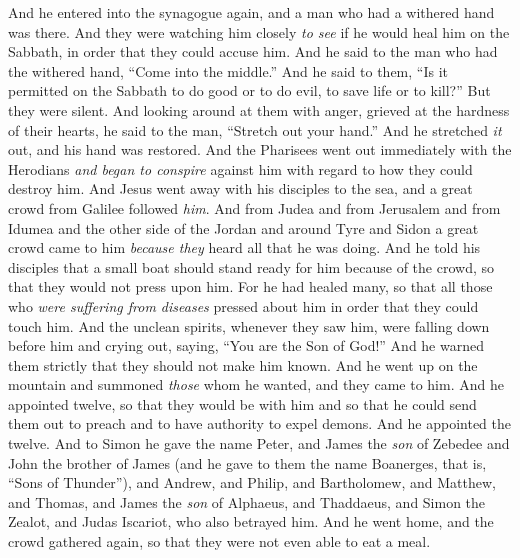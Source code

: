 \begin{biblechapter} %
 And he entered into the synagogue again, and a man who had a withered hand was there.
\verse And they were watching him closely \textit{to see} if he would heal him on the Sabbath, in order that they could accuse him.
\verse And he said to the man who had the withered hand, “Come into the middle.”
\verse And he said to them, “Is it permitted on the Sabbath to do good or to do evil, to save life or to kill?” But they were silent.
\verse And looking around at them with anger, grieved at the hardness of their hearts, he said to the man, “Stretch out your hand.” And he stretched \textit{it} out, and his hand was restored.
\verse And the Pharisees went out immediately with the Herodians \textit{and began to conspire} against him with regard to how they could destroy him.
 And Jesus went away with his disciples to the sea, and a great crowd from Galilee followed \textit{him}. And from Judea
\verse and from Jerusalem and from Idumea and the other side of the Jordan and around Tyre and Sidon a great crowd came to him \textit{because they} heard all that he was doing.
\verse And he told his disciples that a small boat should stand ready for him because of the crowd, so that they would not press upon him.
\verse For he had healed many, so that all those who \textit{were suffering from diseases} pressed about him in order that they could touch him.
\verse And the unclean spirits, whenever they saw him, were falling down before him and crying out, saying, “You are the Son of God!”
\verse And he warned them strictly that they should not make him known.
 And he went up on the mountain and summoned \textit{those} whom he wanted, and they came to him.
\verse And he appointed twelve, so that they would be with him and so that he could send them out to preach
\verse and to have authority to expel demons.
\verse And he appointed the twelve. And to Simon he gave the name Peter,
\verse and James the \textit{son} of Zebedee and John the brother of James (and he gave to them the name Boanerges, that is, “Sons of Thunder”),
\verse and Andrew, and Philip, and Bartholomew, and Matthew, and Thomas, and James the \textit{son} of Alphaeus, and Thaddaeus, and Simon the Zealot,
\verse and Judas Iscariot, who also betrayed him.
 And he went home, and the crowd gathered again, so that they were not even able to eat a meal.

\end{biblechapter}
